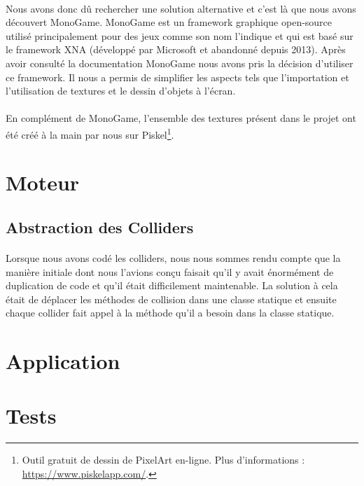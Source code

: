 \documentclass{EPUProjetDi}
\begin{document}
\paragraph{}
Nous avons donc dû rechercher une solution alternative et c'est là que nous avons découvert MonoGame. 
MonoGame est un framework graphique open-source utilisé principalement pour des jeux comme son nom l'indique et qui est basé
sur le framework XNA (développé par Microsoft et abandonné depuis 2013). 
Après avoir consulté la documentation MonoGame nous avons pris la décision d'utiliser ce framework. Il nous a permis de simplifier les aspects tels que l'importation et l'utilisation de textures
et le dessin d'objets à l'écran.

\paragraph{}
En complément de MonoGame, l'ensemble des textures présent dans le projet ont été créé à la main par nous sur Piskel\footnote{Outil gratuit de dessin de PixelArt en-ligne. 
Plus d'informations : \url{https://www.piskelapp.com/}.}. 

\section{Moteur}

\subsection{Abstraction des Colliders}

\paragraph{}
Lorsque nous avons codé les colliders, nous nous sommes rendu compte que la manière initiale dont nous l'avions conçu
faisait qu'il y avait énormément de duplication de code et qu'il était difficilement maintenable.
La solution à cela était de déplacer les méthodes de collision dans une classe statique et ensuite chaque collider fait appel à la méthode qu'il a besoin dans la classe statique.



\section{Application}

\section{Tests}
\end{document}
